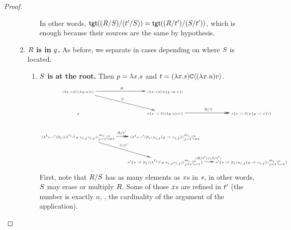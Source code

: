 \begin{proof}
\begin{enumerate}
\begin{enumerate}
\begin{enumerate}
            In other words, $\mathsf{tgt}((R / S) / (t' / S)) =
                             \mathsf{tgt}((R / t') / (S / t'))$, which is enough because their sources
                             are the same by hypothesis.
        \end{enumerate}
      \item {\bf $R$ is in $q$.} As before, we separate in cases depending on where $S$ is located.
        \begin{enumerate}
          \item {\bf $S$ is at the root.} Then $p = \lambda x. s$
            and $t = (\lambda x. s) \mathtt{C}\langle(\lambda x. u) v\rangle$.
            \[
            {\tiny
              \xymatrix@C=.5cm{
              (\lam{\var}{\tmtwo}) \conof{(\lam{\vartwo}{\tmthree}) \tmthreevariant}
                \ar@{->}[r]^{\redex} \ar@{->}[rd]^{\redextwo} \ar@{}[dd]|*=0[@]{\rtimes}
                  & (\lam{\var}{\tmtwo}) \conof{\subs{\tmthree}{\vartwo}{\tmthreevariant}} & \\
                & \subs{\tmtwo}{\var}{\conof{(\lam{\vartwo}{\tmthree}) \tmthreevariant}}
                  \ar@{->>}[r]^{\redex / \redextwo}
                    & \subs{\tmtwo}{\var}{\conof{\subs{\tmthree}{\vartwo}{\tmthreevariant}}} \\
                \ar@{->>}[r]^{\redex / \tm'} \ar@{->}[rd]^{\redextwo / \tm'}
              (\lamp{\lab}{\var}{\tmtwo'}) [\con_i\of{(\lamp{\lab_{i,j}}{\vartwo}{\tmthree_{i,j}} \tmthreevariant_{i,j})}_{j=1}^{m_i}]_{i=1}^n
                  & (\lamp{\lab}{\var}{\tmtwo'}) [\con_i\of{\subs{\tmthree_{i,j}}{\vartwo}{\tmthreevariant_{i,j}}}_{j=1}^{m_i}]_{i=1}^n & \\
                & \subs{\tmtwo'}{\var}{[\con_i\of{(\lamp{\lab_{i,j}}{\vartwo}{\tmthree_{i,j}} \tmthreevariant_{i,j})}_{j=1}^{m_i}]_{i=1}^n} \ar@{->}[r]^{(\redex / \tm') / (\redextwo / \tm')}
                  & \subs{\tmtwo'}{\var}{[\con_i\of{\subs{\tmthree_{i,j}}{\vartwo}{\tmthreevariant_{i,j}}}_{j=1}^{m_i}]_{i=1}^n}
              }
            }
            \]
            First, note that $R / S$ has as many elements as $x$s in $s$, in other words,
            $S$ may erase or multiply $R$.
            Some of those $x$s are refined in $t'$ (the number is exactly $n$,
            \ie, the cardinality of the argument of the application).


\end{enumerate}
\end{enumerate}
\end{enumerate}
\end{proof}

